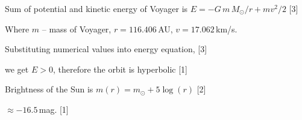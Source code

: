 Sum of potential and kinetic energy of Voyager is
$E = -G\,m\,M_\odot/r + mv^2/2$ \hfill[3]

Where $m$ -- mass of Voyager, $r = 116.406$\,AU, $v = 17.062$\,km/s.

Substituting numerical values into energy equation, \hfill[3]

we get $E > 0$, therefore the orbit is hyperbolic \hfill[1]

Brightness of the Sun is $m(r) = m_\odot + 5\log(r)$ \hfill[2]

$\approx -16.5$\,mag. \hfill[1]
